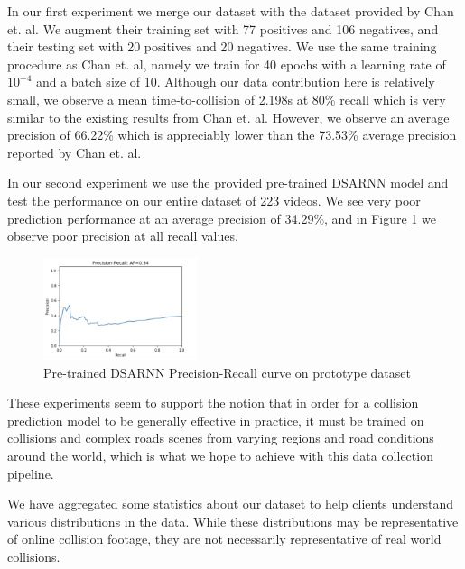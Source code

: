 \documentclass[letterpaper, 10 pt, conference]{ieeeconf}
\begin{document}
In our first experiment we merge our dataset with the dataset provided by Chan et. al. We augment their training set with 77 positives and 106 negatives, and their testing set with 20 positives and 20 negatives. We use the same training procedure as Chan et. al, namely we train for 40 epochs with a learning rate of $10^{-4}$ and a batch size of 10. Although our data contribution here is relatively small, we observe a mean time-to-collision of 2.198s at 80\% recall which is very similar to the existing results from Chan et. al. However, we observe an average precision of 66.22\% which is appreciably lower than the 73.53\% average precision reported by Chan et. al. \cite{chan2016anticipating}

In our second experiment we use the provided pre-trained DSARNN model and test the performance on our entire dataset of 223 videos. We see very poor prediction performance at an average precision of 34.29\%, and in Figure \ref{fig:pr_curve} we observe poor precision at all recall values.

\begin{figure}[htpb]
		\centering
		\includegraphics[width=0.4\textwidth]{prcurve.png}
		\caption{Pre-trained DSARNN Precision-Recall curve on prototype dataset}
		\label{fig:pr_curve}
\end{figure}

These experiments seem to support the notion that in order for a collision prediction model to be generally effective in practice, it must be trained on collisions and complex roads scenes from varying regions and road conditions around the world, which is what we hope to achieve with this data collection pipeline.


\byclass
{}\byactors
{}\byagents
{}\byduration

We have aggregated some statistics about our dataset to help clients understand various distributions in the data. While these distributions may be representative of online collision footage, they are not necessarily representative of real world collisions. 
\end{document}

